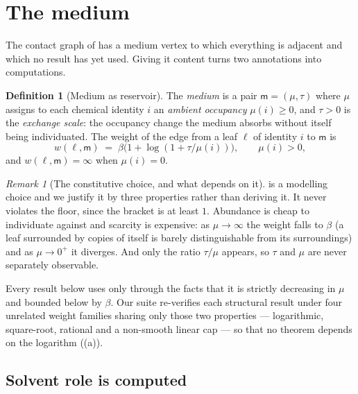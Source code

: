 \documentclass[11pt,twocolumn,a4paper]{article}
\theoremstyle{thmstyle}
\theoremstyle{definition}
\newtheorem{definition}[theorem]{Definition}
\theoremstyle{remark}
\newtheorem{remark}[theorem]{Remark}
\newcommand{\med}{\mathsf{m}}
\newcommand{\flo}{\beta}
\begin{document}
\section{The medium}
\label{sec:medium}

The contact graph of  has a medium vertex to which
everything is adjacent and which no result has yet used. Giving it content
turns two annotations into computations.

\begin{definition}[Medium as reservoir]
\label{def:medium}
The \emph{medium} is a pair $\med=(\mu,\tau)$ where $\mu$ assigns to each
chemical identity $i$ an \emph{ambient occupancy} $\mu(i) \geq 0$, and
$\tau>0$ is the \emph{exchange scale}: the occupancy change the medium absorbs
without itself being individuated. The weight of the edge from a leaf $\ell$
of identity $i$ to $\med$ is
\begin{equation}
w(\ell,\med) \;=\; \flo\bigl(1+\log(1+\tau/\mu(i))\bigr),
\qquad \mu(i)>0,
\label{eq:mediumweight}
\end{equation}
and $w(\ell,\med)=\infty$ when $\mu(i)=0$.
\end{definition}

\begin{remark}[The constitutive choice, and what depends on it]
\label{rem:constitutive}
 is a modelling choice and we justify it by three
properties rather than deriving it. It never violates the floor, since the
bracket is at least $1$. Abundance is cheap to individuate against and
scarcity is expensive: as $\mu \to \infty$ the weight falls to $\flo$ (a leaf
surrounded by copies of itself is barely distinguishable from its
surroundings) and as $\mu \to 0^+$ it diverges. And only the ratio $\tau/\mu$
appears, so $\tau$ and $\mu$ are never separately observable.

Every result below uses  only through the facts that it
is strictly decreasing in $\mu$ and bounded below by $\flo$. Our suite
re-verifies each structural result under four unrelated weight families
sharing only those two properties --- logarithmic, square-root, rational and a
non-smooth linear cap --- so that no theorem depends on the logarithm
((a)).
\end{remark}

\subsection{Solvent role is computed}
\end{document}
